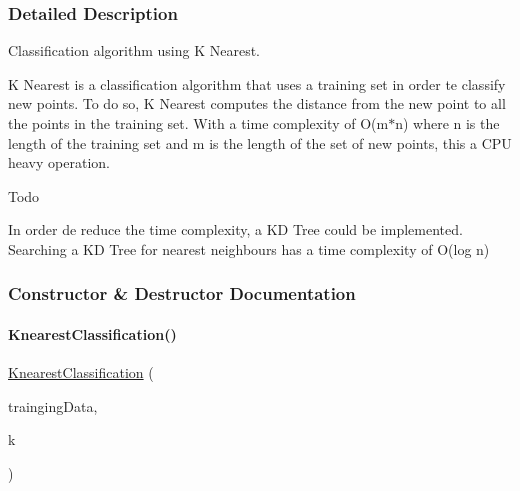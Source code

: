 \subsubsection{Detailed Description}
Classification algorithm using K Nearest. 

K Nearest is a classification algorithm that uses a training set in order te classify new points. To do so, K Nearest computes the distance from the new point to all the points in the training set. With a time complexity of {\ttfamily O(m$\ast$n)} where {\ttfamily n} is the length of the training set and {\ttfamily m} is the length of the set of new points, this a C\+PU heavy operation.

\begin{DoxyRefDesc}{Todo}
\item[\hyperlink{todo__todo000001}{Todo}]In order de reduce the time complexity, a KD Tree could be implemented. Searching a KD Tree for nearest neighbours has a time complexity of {\ttfamily O(log n)} \end{DoxyRefDesc}


\subsubsection{Constructor \& Destructor Documentation}
\mbox{\label{classDataTools_1_1classification_1_1KnearestClassification_a588873a311daa525f0bdf6663b1d5eef_a588873a311daa525f0bdf6663b1d5eef}} 
\paragraph{\texorpdfstring{Knearest\+Classification()}{KnearestClassification()}}
{\footnotesize\ttfamily \hyperlink{classDataTools_1_1classification_1_1KnearestClassification}{Knearest\+Classification} (\begin{DoxyParamCaption}\item[{Dictionary$<$ int, I\+Enumerable$<$ \hyperlink{classDataTools_1_1GenericVector}{Generic\+Vector} $>$$>$}]{trainging\+Data,  }\item[{int}]{k }\end{DoxyParamCaption})}

